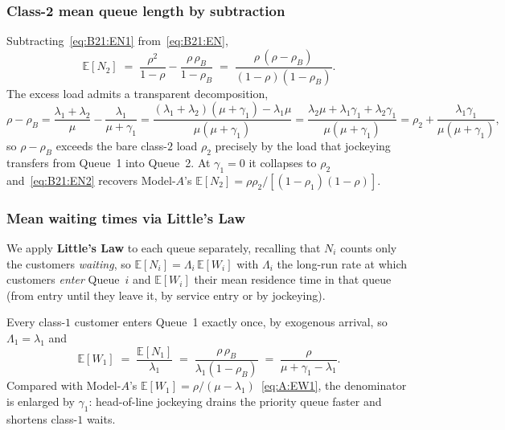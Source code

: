 \documentclass{article}
\numberwithin{equation}{section}
\begin{document}
\subsubsection{Class-2 mean queue length by subtraction}

Subtracting~\eqref{eq:B21:EN1} from~\eqref{eq:B21:EN},
\begin{equation}
    \mathbb{E}[N_2]
    \;=\; \frac{\rho^2}{1-\rho} - \frac{\rho\,\rho_B}{1-\rho_B}
    \;=\; \frac{\rho\,(\rho-\rho_B)}{(1-\rho)(1-\rho_B)}.
    \label{eq:B21:EN2}
\end{equation}
The excess load admits a transparent decomposition,
\begin{equation*}
    \rho-\rho_B
    = \frac{\lambda_1+\lambda_2}{\mu} - \frac{\lambda_1}{\mu+\gamma_1}
    = \frac{(\lambda_1+\lambda_2)(\mu+\gamma_1)-\lambda_1\mu}{\mu(\mu+\gamma_1)}
    = \frac{\lambda_2\mu+\lambda_1\gamma_1+\lambda_2\gamma_1}{\mu(\mu+\gamma_1)}
    = \rho_2 + \frac{\lambda_1\gamma_1}{\mu(\mu+\gamma_1)},
\end{equation*}
so $\rho-\rho_B$ exceeds the bare class-$2$ load $\rho_2$ precisely by the load that
jockeying transfers from Queue~1 into Queue~2. At $\gamma_1=0$ it collapses to $\rho_2$
and~\eqref{eq:B21:EN2} recovers Model-$A$'s
$\mathbb{E}[N_2]=\rho\rho_2/[(1-\rho_1)(1-\rho)]$.

\subsubsection{Mean waiting times via Little's Law}

We apply \textbf{Little's Law} to each queue separately, recalling that $N_i$ counts only
the customers \emph{waiting}, so $\mathbb{E}[N_i]=\Lambda_i\,\mathbb{E}[W_i]$ with
$\Lambda_i$ the long-run rate at which customers \emph{enter} Queue~$i$ and $\mathbb{E}[W_i]$
their mean residence time in that queue (from entry until they leave it, by service entry or
by jockeying).

Every class-$1$ customer enters Queue~1 exactly once, by exogenous arrival, so
$\Lambda_1=\lambda_1$ and
\begin{equation*}
    \mathbb{E}[W_1] \;=\; \frac{\mathbb{E}[N_1]}{\lambda_1}
    \;=\; \frac{\rho\,\rho_B}{\lambda_1(1-\rho_B)}
    \;=\; \frac{\rho}{\mu+\gamma_1-\lambda_1}.
\end{equation*}
Compared with Model-$A$'s $\mathbb{E}[W_1]=\rho/(\mu-\lambda_1)$~\eqref{eq:A:EW1}, the
denominator is enlarged by $\gamma_1$: head-of-line jockeying drains the priority queue
faster and shortens class-$1$ waits.
\end{document}
